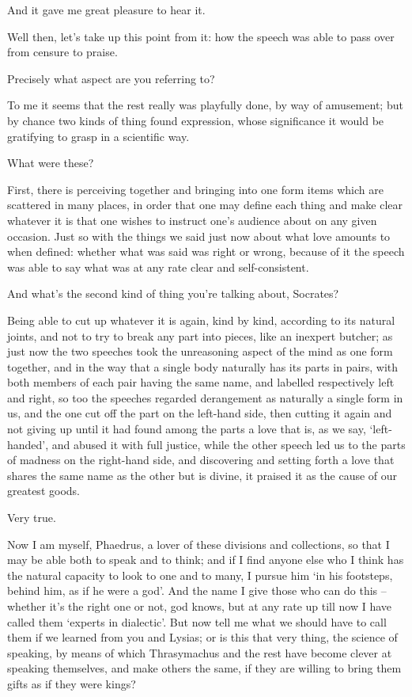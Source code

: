 And it gave me great pleasure to hear it.

 Well then, let's take up this point from it: how the
speech was able to pass
over from censure to praise.

Precisely what aspect are you referring to?

To me it seems that the rest really was playfully done, by way
of amusement; but by chance two kinds of
thing found expression,
whose significance it would be gratifying to grasp in a scientific way.

What were these?

First, there is perceiving together and bringing into one form
items which are scattered in many
places, in order that
one may define each thing and make clear whatever it is  that
one wishes to instruct
one's audience about on any given occasion. Just so with the things we
said just now about what love amounts to when defined: whether what was
said was right or wrong, because of it the
speech was able to say
what was at any rate clear and self-consistent.

And what's the second kind of thing you're talking about,
Socrates?

Being able to cut up whatever it is again, kind by
kind, according to its
natural joints, and not to try to break any part into pieces, like an
inexpert butcher; as just now the two speeches took the unreasoning
aspect of the mind as one  form together, and in the way that
a single body naturally has its parts in pairs, with both members of
each pair having the same name, and labelled respectively left and
right, so too the speeches regarded derangement as naturally a single
form in us, and the one cut off the part on the left-hand side, then
cutting  it again and not giving up until it had found among the
parts a love that is, as we say, ‘left-handed', and abused it with full
justice, while the other speech led us to the parts of madness on the
right-hand side, and discovering and setting forth a love that shares
the same name as the other but is divine, it praised  it as the
cause of our greatest goods.

Very true.

Now I am myself, Phaedrus, a lover of these divisions and
collections, so that I may be able both to speak and  to think;
and if I find anyone else who I think has the natural capacity to look
to one and to many, I
pursue him ‘in his footsteps, behind him, as if he were a
god'. And the name I
give those who can do this -- whether it's the right one or not, god
knows, but at any rate
up till now I have called them  ‘experts in
dialectic'. But now tell
me what we should have to call them if we learned from you and Lysias;
or is this that very thing, the science of speaking, by means of which
Thrasymachus and the rest have become clever at speaking themselves, and
make others the same, if they are willing to  bring them gifts
as if they were kings?

